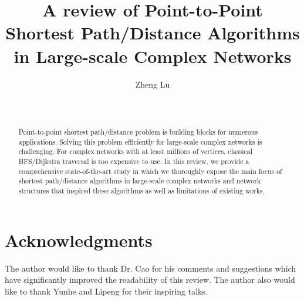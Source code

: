 \documentclass{acm_proc_article-sp}
\begin{document}
\title{A review of Point-to-Point Shortest Path/Distance Algorithms in Large-scale Complex Networks}
\author{
\alignauthor
Zheng Lu\\
\\
       \\
}
\maketitle
\begin{abstract}

Point-to-point shortest path/distance problem is building blocks for numerous applications. Solving this problem efficiently for large-scale complex networks is challenging. For complex networks with at least millions of vertices, classical BFS/Dijkstra traversal is too expensive to use. In this review, we provide a comprehensive state-of-the-art study in which we thoroughly expose the main focus of shortest path/distance algorithms in large-scale complex networks and network structures that inspired these algorithms as well as limitations of existing works.  

\end{abstract}






\section{Acknowledgments}
The author would like to thank Dr. Cao for his comments and suggestions which have significantly improved the readability of this review. The author also would like to thank Yunhe and Lipeng for their inspiring talks.


  
\end{document}
